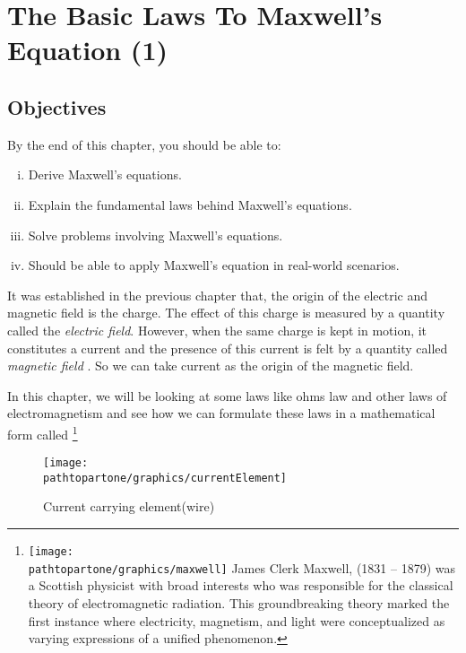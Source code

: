 \chapter{The Basic Laws To Maxwell's Equation (1)}\label{lec:lec18}


\begin{mdframed}[backgroundcolor=lightblue, linewidth=1pt, hidealllines=true]
\section{Objectives}
By the end of this chapter, you should be able to:
\begin{enumerate}[(i)]
\item Derive Maxwell's equations. 

\item Explain the fundamental laws behind Maxwell's equations.

\item Solve problems involving Maxwell's equations.

\item Should be able to apply Maxwell's equation in real-world scenarios.
\end{enumerate}
\end{mdframed}	

It was established in the previous chapter that, the origin of the electric and magnetic field is the charge. The effect of this charge is measured by a quantity called the \emph{electric field}. However, when the same charge is kept in motion, it constitutes a current and the presence of this current is felt by a quantity called \emph{magnetic field} . So we can take current as the origin of the magnetic field. 

In this chapter, we will be looking at some laws like ohms law and other laws of electromagnetism and see how we can formulate these laws in a mathematical form called 
\footnote{
\texttt{[image: \\pathtopartone/graphics/maxwell]}
James Clerk Maxwell, (1831 – 1879) was a Scottish physicist with broad interests who was responsible for the classical theory of electromagnetic radiation. This groundbreaking theory marked the first instance where electricity, magnetism, and light were conceptualized as varying expressions of a unified phenomenon.
}
\begin{figure}[h]
\centering
\texttt{[image: \\pathtopartone/graphics/currentElement]}
\caption{Current carrying element(wire)}
\label{fig:currentelement}
\end{figure}

